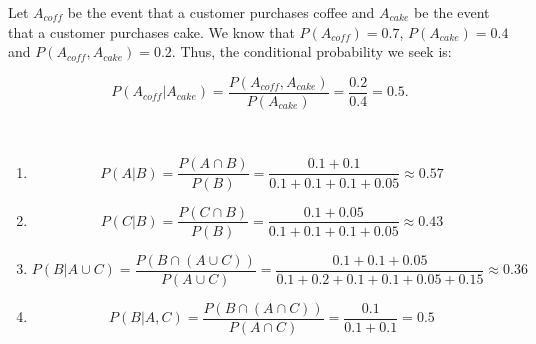 \begin{problem}{22} Let $A_{coff}$ be the event that a customer purchases coffee and $A_{cake}$ be the event that a customer purchases cake.  We know that $P(A_{coff}) = 0.7$, $P(A_{cake}) = 0.4$ and $P(A_{coff}, A_{cake}) = 0.2$.  Thus, the conditional probability we seek is:

	\begin{equation*}
		P(A_{coff}|A_{cake}) = \frac{P(A_{coff}, A_{cake})}{P(A_{cake}) } = \frac{0.2}{0.4}=0.5.
	\end{equation*}

\end{problem} 

\begin{problem}{23} $ $
	\begin{enumerate}
		\item 
			\begin{equation*}
				P(A|B) = \frac{P(A \cap B)}{P(B)} = \frac{0.1+0.1}{0.1+0.1+0.1+0.05} \approx 0.57
			\end{equation*}
			
		\item 
			\begin{equation*}
				P(C|B) = \frac{P(C \cap B)}{P(B)} = \frac{0.1+0.05}{0.1+0.1+0.1+0.05} \approx 0.43
			\end{equation*}
			
		\item 
			\begin{equation*}
				P(B|A \cup C) = \frac{P(B\cap ( A\cup C))}{P( A\cup C)} = \frac{0.1+0.1+0.05}{0.1+0.2+0.1+0.1+0.05+0.15} \approx 0.36
			\end{equation*}
			
		\item 
			\begin{equation*}
				P(B|A, C) = \frac{P(B \cap (A \cap C))}{P(A \cap C)} = \frac{0.1}{0.1+0.1} =0.5
			\end{equation*}
		
	\end{enumerate}

\end{problem} 



